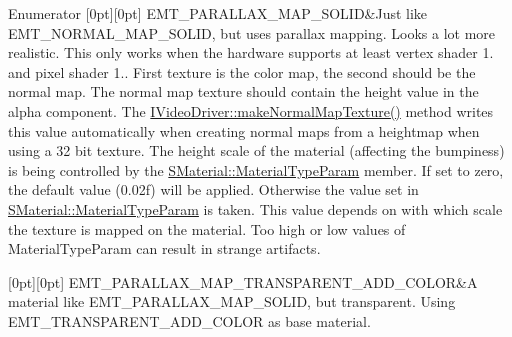 \begin{DoxyEnumFields}{Enumerator}
[0pt][0pt]{}\mbox{\label{namespaceirr_1_1video_ac8e9b6c66f7cebabd1a6d30cbc5430f1a833aaad409476c3c4baf59e2d1096f4a}} 
E\+M\+T\+\_\+\+P\+A\+R\+A\+L\+L\+A\+X\+\_\+\+M\+A\+P\+\_\+\+S\+O\+L\+ID&Just like E\+M\+T\+\_\+\+N\+O\+R\+M\+A\+L\+\_\+\+M\+A\+P\+\_\+\+S\+O\+L\+ID, but uses parallax mapping. Looks a lot more realistic. This only works when the hardware supports at least vertex shader 1. and pixel shader 1.. First texture is the color map, the second should be the normal map. The normal map texture should contain the height value in the alpha component. The \hyperlink{classirr_1_1video_1_1IVideoDriver_a6470e31c1aaf2c0fa5e5a5b3f8f092e0}{I\+Video\+Driver\+::make\+Normal\+Map\+Texture()} method writes this value automatically when creating normal maps from a heightmap when using a 32 bit texture. The height scale of the material (affecting the bumpiness) is being controlled by the \hyperlink{classirr_1_1video_1_1SMaterial_aefe0acce491efa8dedcd2b7cb49f8133}{S\+Material\+::\+Material\+Type\+Param} member. If set to zero, the default value (0.\+02f) will be applied. Otherwise the value set in \hyperlink{classirr_1_1video_1_1SMaterial_aefe0acce491efa8dedcd2b7cb49f8133}{S\+Material\+::\+Material\+Type\+Param} is taken. This value depends on with which scale the texture is mapped on the material. Too high or low values of Material\+Type\+Param can result in strange artifacts. \\
\hline

[0pt][0pt]{}\mbox{\label{namespaceirr_1_1video_ac8e9b6c66f7cebabd1a6d30cbc5430f1a84787f1dfcbdc1578ecd84f6de4a22a1}} 
E\+M\+T\+\_\+\+P\+A\+R\+A\+L\+L\+A\+X\+\_\+\+M\+A\+P\+\_\+\+T\+R\+A\+N\+S\+P\+A\+R\+E\+N\+T\+\_\+\+A\+D\+D\+\_\+\+C\+O\+L\+OR&A material like E\+M\+T\+\_\+\+P\+A\+R\+A\+L\+L\+A\+X\+\_\+\+M\+A\+P\+\_\+\+S\+O\+L\+ID, but transparent. Using E\+M\+T\+\_\+\+T\+R\+A\+N\+S\+P\+A\+R\+E\+N\+T\+\_\+\+A\+D\+D\+\_\+\+C\+O\+L\+OR as base material. \\
\hline


\end{DoxyEnumFields}
